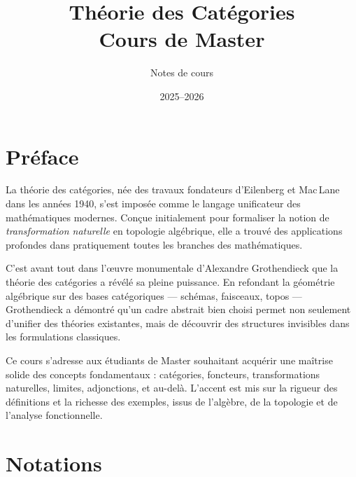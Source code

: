 \documentclass[a4paper,12pt]{book}
\title{\Huge\textbf{Théorie des Catégories} \\ \Large Cours de Master}
\author{Notes de cours}
\date{2025--2026}
\begin{document}
\maketitle
\dominitoc
\tableofcontents

\chapter*{Préface}

La théorie des catégories, née des travaux fondateurs d'Eilenberg et Mac\,Lane dans les années 1940, s'est imposée comme le langage unificateur des mathématiques modernes. Conçue initialement pour formaliser la notion de \emph{transformation naturelle} en topologie algébrique, elle a trouvé des applications profondes dans pratiquement toutes les branches des mathématiques.

C'est avant tout dans l'\oe uvre monumentale d'Alexandre Grothendieck que la théorie des catégories a révélé sa pleine puissance. En refondant la géométrie algébrique sur des bases catégoriques --- schémas, faisceaux, topos --- Grothendieck a démontré qu'un cadre abstrait bien choisi permet non seulement d'unifier des théories existantes, mais de découvrir des structures invisibles dans les formulations classiques.

Ce cours s'adresse aux étudiants de Master souhaitant acquérir une maîtrise solide des concepts fondamentaux : catégories, foncteurs, transformations naturelles, limites, adjonctions, et au-delà. L'accent est mis sur la rigueur des définitions et la richesse des exemples, issus de l'algèbre, de la topologie et de l'analyse fonctionnelle.

\bigskip

\chapter*{Notations}
\end{document}
